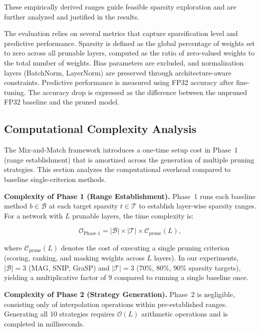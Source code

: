 \documentclass[11pt, conference]{IEEEtran}
\begin{document}
These empirically derived ranges guide feasible sparsity exploration and are further analyzed and justified in the results.

The evaluation relies on several metrics that capture sparsification level and predictive performance. Sparsity is defined as the global percentage of weights set to zero across all prunable layers, computed as the ratio of zero-valued weights to the total number of weights. Bias parameters are excluded, and normalization layers (BatchNorm, LayerNorm) are preserved through architecture-aware constraints. Predictive performance is measured using FP32 accuracy after fine-tuning. The accuracy drop is expressed as the difference between the unpruned FP32 baseline and the pruned model.

\FloatBarrier
\subsection{Computational Complexity Analysis}
\label{sec:complexity}

The Mix-and-Match framework introduces a one-time setup cost in Phase~1 (range establishment) that is amortized across the generation of multiple pruning strategies. This section analyzes the computational overhead compared to baseline single-criterion methods.

\textbf{Complexity of Phase 1 (Range Establishment).}
Phase~1 runs each baseline method $b \in \mathcal{B}$ at each target sparsity $t \in \mathcal{T}$ to establish layer-wise sparsity ranges. For a network with $L$ prunable layers, the time complexity is:

\begin{equation}
\mathcal{O}_{\text{Phase 1}} = |\mathcal{B}| \times |\mathcal{T}| \times \mathcal{C}_{\text{prune}}(L),
\end{equation}

where $\mathcal{C}_{\text{prune}}(L)$ denotes the cost of executing a single pruning criterion (scoring, ranking, and masking weights across $L$ layers). In our experiments, $|\mathcal{B}| = 3$ (MAG, SNIP, GraSP) and $|\mathcal{T}| = 3$ (70\%, 80\%, 90\% sparsity targets), yielding a multiplicative factor of 9 compared to running a single baseline once.

\textbf{Complexity of Phase 2 (Strategy Generation).}
Phase~2 is negligible, consisting only of interpolation operations within pre-established ranges. Generating all 10 strategies requires $\mathcal{O}(L)$ arithmetic operations and is completed in milliseconds.
\end{document}
